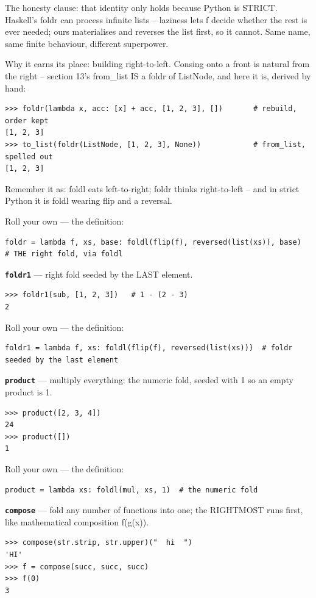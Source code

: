 \documentclass[10pt,letterpaper]{article}
\begin{document}
The honesty clause: that identity only holds because Python is STRICT. Haskell's foldr can process infinite lists -- laziness lets f decide whether the rest is ever needed; ours materialises and reverses the list first, so it cannot. Same name, same finite behaviour, different superpower.


Why it earns its place: building right-to-left. Consing onto a front is natural from the right -- section 13's from\_list IS a foldr of ListNode, and here it is, derived by hand:

\begin{lstlisting}[style=ex]
>>> foldr(lambda x, acc: [x] + acc, [1, 2, 3], [])       # rebuild, order kept
[1, 2, 3]
>>> to_list(foldr(ListNode, [1, 2, 3], None))            # from_list, spelled out
[1, 2, 3]
\end{lstlisting}

Remember it as: foldl eats left-to-right; foldr thinks right-to-left -- and in strict Python it is foldl wearing flip and a reversal.


Roll your own --- the definition:

\begin{lstlisting}[style=ex]
foldr = lambda f, xs, base: foldl(flip(f), reversed(list(xs)), base)  # THE right fold, via foldl
\end{lstlisting}
\textbf{\texttt{foldr1}} --- right fold seeded by the LAST element.
\begin{lstlisting}[style=ex]
>>> foldr1(sub, [1, 2, 3])   # 1 - (2 - 3)
2
\end{lstlisting}

Roll your own --- the definition:

\begin{lstlisting}[style=ex]
foldr1 = lambda f, xs: foldl(flip(f), reversed(list(xs)))  # foldr seeded by the last element
\end{lstlisting}
\textbf{\texttt{product}} --- multiply everything: the numeric fold, seeded with 1 so an empty product is 1.
\begin{lstlisting}[style=ex]
>>> product([2, 3, 4])
24
>>> product([])
1
\end{lstlisting}

Roll your own --- the definition:

\begin{lstlisting}[style=ex]
product = lambda xs: foldl(mul, xs, 1)  # the numeric fold
\end{lstlisting}
\textbf{\texttt{compose}} --- fold any number of functions into one; the RIGHTMOST runs first, like mathematical composition f(g(x)).
\begin{lstlisting}[style=ex]
>>> compose(str.strip, str.upper)("  hi  ")
'HI'
>>> f = compose(succ, succ, succ)
>>> f(0)
3
\end{lstlisting}
\end{document}
